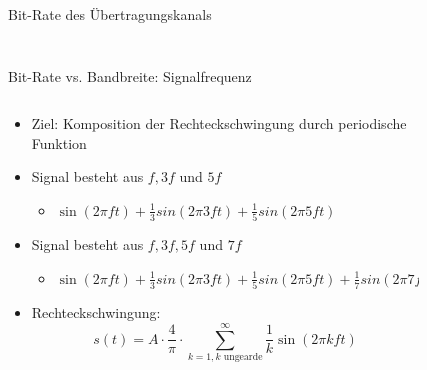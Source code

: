 \documentclass[xcolor=dvipsnames,aspectratio=169]{beamer}
\begin{document}
\begin{frame}{Bit-Rate des Übertragungskanals}
\begin{columns}[T]
\begin{column}{.4\textwidth}
\begin{figure}
\end{figure}
\end{column}%
\end{columns}
\end{frame}

\begin{frame}{Bit-Rate vs. Bandbreite: Signalfrequenz}
\begin{columns}[T] %
\begin{column}{.6\textwidth}
\vspace*{-.7cm}
\begin{itemize}
	\item Ziel: Komposition der Rechteckschwingung durch periodische Funktion
	\item Signal besteht aus $f, 3f$ und $5f$
	\begin{itemize}
		\item $\sin(2\pi f t) + \frac{1}{3} sin(2 \pi 3 f t) + \frac{1}{5} sin(2 \pi 5 f t)$
	\end{itemize}
	\item Signal besteht aus $f, 3f, 5f$ und $7f$
	\begin{itemize}
		\item $\sin(2\pi f t) + \frac{1}{3} sin(2 \pi 3 f t) + \frac{1}{5} sin(2 \pi 5 f t) + \frac{1}{7} sin(2 \pi 7 f t)$
	\end{itemize}
	\item Rechteckschwingung:
	$$ s(t) = A \cdot \frac{4}{\pi} \cdot \sum_{k=1, k \text{ ungearde}}^\infty \frac{1}{k} \sin(2 \pi k f t) $$
\end{itemize}
\end{column}%
\hfill%
\begin{column}{.4\textwidth}
\vspace*{-.7cm}
\begin{figure}
\centering

\end{figure}
\end{column}
\end{columns}
\end{frame}
\end{document}
